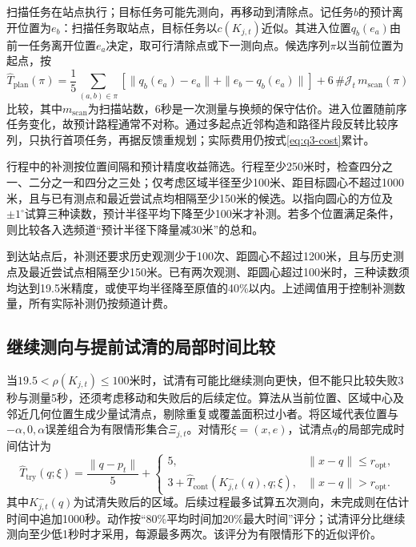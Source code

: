 扫描任务在站点执行；目标任务可能先测向，再移动到清除点。记任务$b$的预计离开位置为$e_b$：扫描任务取站点，目标任务以$c(K_{j,t})$近似。其进入位置$q_b(e_a)$由前一任务离开位置$e_a$决定，取可行清除点或下一测向点。候选序列$\pi$以当前位置为起点，按
\begin{equation}
\widehat T_{\mathrm{plan}}(\pi)=
\frac15\sum_{(a,b)\in\pi}
\left[\|q_b(e_a)-e_a\|+\|e_b-q_b(e_a)\|\right]
+6\,\#\mathcal J_t\,m_{\mathrm{scan}}(\pi)
\label{eq:q3-route-score}
\end{equation}
比较，其中$m_{\mathrm{scan}}$为扫描站数，6秒是一次测量与换频的保守估价。进入位置随前序任务变化，故预计路程通常不对称。通过多起点近邻构造和路径片段反转比较序列，只执行首项任务，再据反馈重规划；实际费用仍按式\eqref{eq:q3-cost}累计。

行程中的补测按位置间隔和预计精度收益筛选。行程至少250米时，检查四分之一、二分之一和四分之三处；仅考虑区域半径至少100米、距目标圆心不超过1000米，且与已有测点和最近尝试点均相隔至少150米的候选。以指向圆心的方位及$\pm1^\circ$试算三种读数，预计半径平均下降至少100米才补测。若多个位置满足条件，则比较各入选频道“预计半径下降量减30米”的总和。

到达站点后，补测还要求历史观测少于100次、距圆心不超过1200米，且与历史测点及最近尝试点相隔至少150米。已有两次观测、距圆心超过100米时，三种读数须均达到19.5米精度，或使平均半径降至原值的40\%以内。上述阈值用于控制补测数量，所有实际补测仍按频道计费。

\subsection{继续测向与提前试清的局部时间比较}

当$19.5<\rho(K_{j,t})\le100$米时，试清有可能比继续测向更快，但不能只比较失败3秒与测量5秒，还须考虑移动和失败后的后续定位。算法从当前位置、区域中心及邻近几何位置生成少量试清点，剔除重复或覆盖面积过小者。将区域代表位置与$-\alpha,0,\alpha$误差组合为有限情形集合$\Xi_{j,t}$。对情形$\xi=(x,e)$，试清点$q$的局部完成时间估计为
\begin{equation}
\widehat T_{\mathrm{try}}(q;\xi)=\frac{\|q-p_t\|}{5}+
\begin{cases}
5,&\|x-q\|\le r_{\mathrm{opt}},\\
3+\widehat T_{\mathrm{cont}}(K^-_{j,t}(q),q;\xi),&\|x-q\|>r_{\mathrm{opt}}.
\end{cases}
\label{eq:q3-optical-value}
\end{equation}
其中$K^-_{j,t}(q)$为试清失败后的区域。后续过程最多试算五次测向，未完成则在估计时间中追加1000秒。动作按“80\%平均时间加20\%最大时间”评分；试清评分比继续测向至少低1秒时才采用，每源最多两次。该评分为有限情形下的近似评价。

